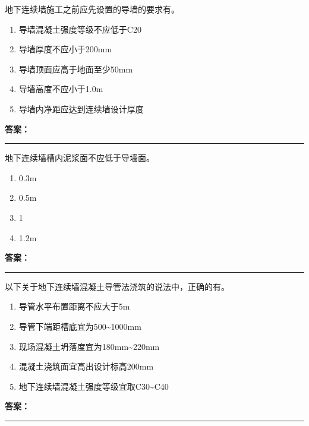 \documentclass[UTF8,fontset=fandol,11pt]{ctexart}
\newcommand{\answerline}{\textcolor{answerred}{\rule{2.4cm}{0.7pt}}}
\begin{document}
\vspace{0.2em}

\begin{quizbox}[title={第 4 题}]
地下连续墙施工之前应先设置的导墙的要求有。\\
\begin{enumerate}[label=\Alph*.]
\item 导墙混凝土强度等级不应低于C20
\item 导墙厚度不应小于200mm
\item 导墙顶面应高于地面至少50mm
\item 导墙高度不应小于1.0m
\item 导墙内净距应达到连续墙设计厚度
\end{enumerate}
\textbf{\textcolor{answerred}{答案：}} \answerline
\end{quizbox}

\vspace{0.2em}

\begin{quizbox}[title={第 5 题}]
地下连续墙槽内泥浆面不应低于导墙面。\\
\begin{enumerate}[label=\Alph*.]
\item 0.3m
\item 0.5m
\item 1
\item 1.2m
\end{enumerate}
\textbf{\textcolor{answerred}{答案：}} \answerline
\end{quizbox}

\vspace{0.2em}

\begin{quizbox}[title={第 6 题}]
以下关于地下连续墙混凝土导管法浇筑的说法中，正确的有。\\
\begin{enumerate}[label=\Alph*.]
\item 导管水平布置距离不应大于5m
\item 导管下端距槽底宜为500\textasciitilde{}1000mm
\item 现场混凝土坍落度宜为180mm\textasciitilde{}220mm
\item 混凝土浇筑面宜高出设计标高200mm
\item 地下连续墙混凝土强度等级宜取C30\textasciitilde{}C40
\end{enumerate}
\textbf{\textcolor{answerred}{答案：}} \answerline
\end{quizbox}

\vspace{0.2em}
\end{document}
